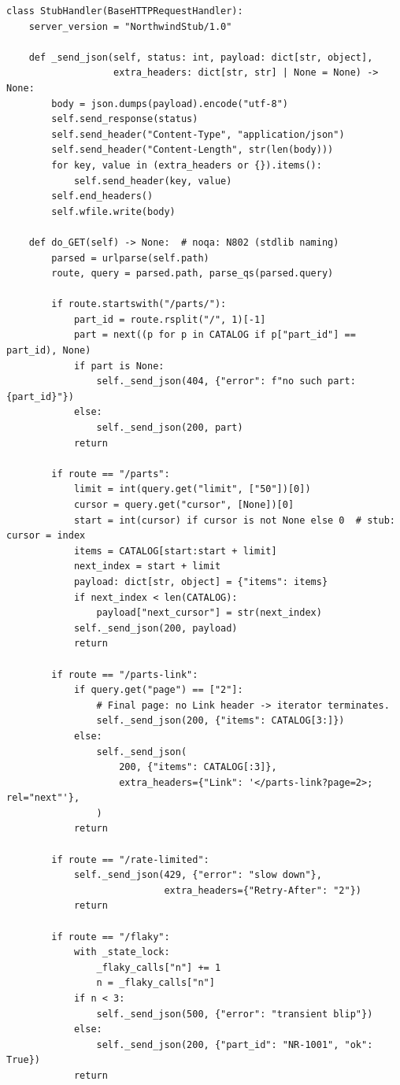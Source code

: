 \begin{verbatim}
class StubHandler(BaseHTTPRequestHandler):
    server_version = "NorthwindStub/1.0"

    def _send_json(self, status: int, payload: dict[str, object],
                   extra_headers: dict[str, str] | None = None) -> None:
        body = json.dumps(payload).encode("utf-8")
        self.send_response(status)
        self.send_header("Content-Type", "application/json")
        self.send_header("Content-Length", str(len(body)))
        for key, value in (extra_headers or {}).items():
            self.send_header(key, value)
        self.end_headers()
        self.wfile.write(body)

    def do_GET(self) -> None:  # noqa: N802 (stdlib naming)
        parsed = urlparse(self.path)
        route, query = parsed.path, parse_qs(parsed.query)

        if route.startswith("/parts/"):
            part_id = route.rsplit("/", 1)[-1]
            part = next((p for p in CATALOG if p["part_id"] == part_id), None)
            if part is None:
                self._send_json(404, {"error": f"no such part: {part_id}"})
            else:
                self._send_json(200, part)
            return

        if route == "/parts":
            limit = int(query.get("limit", ["50"])[0])
            cursor = query.get("cursor", [None])[0]
            start = int(cursor) if cursor is not None else 0  # stub: cursor = index
            items = CATALOG[start:start + limit]
            next_index = start + limit
            payload: dict[str, object] = {"items": items}
            if next_index < len(CATALOG):
                payload["next_cursor"] = str(next_index)
            self._send_json(200, payload)
            return

        if route == "/parts-link":
            if query.get("page") == ["2"]:
                # Final page: no Link header -> iterator terminates.
                self._send_json(200, {"items": CATALOG[3:]})
            else:
                self._send_json(
                    200, {"items": CATALOG[:3]},
                    extra_headers={"Link": '</parts-link?page=2>; rel="next"'},
                )
            return

        if route == "/rate-limited":
            self._send_json(429, {"error": "slow down"},
                            extra_headers={"Retry-After": "2"})
            return

        if route == "/flaky":
            with _state_lock:
                _flaky_calls["n"] += 1
                n = _flaky_calls["n"]
            if n < 3:
                self._send_json(500, {"error": "transient blip"})
            else:
                self._send_json(200, {"part_id": "NR-1001", "ok": True})
            return


\end{verbatim}
